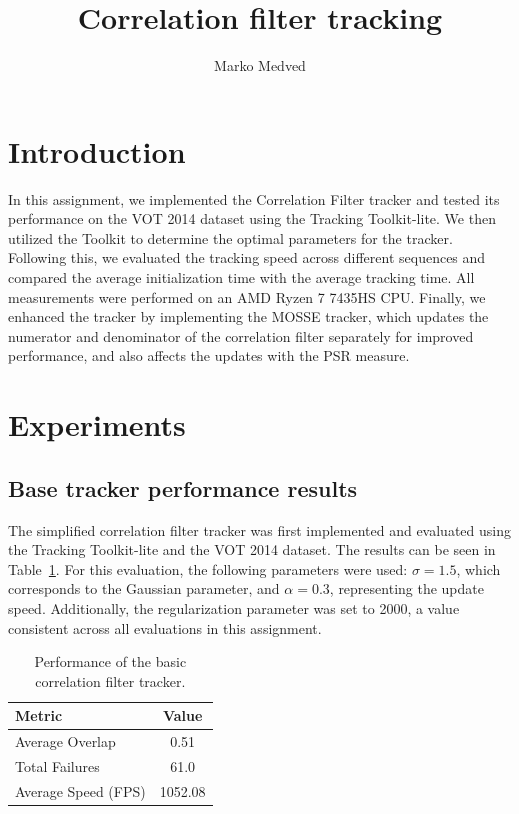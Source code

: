 \documentclass[9pt]{IEEEtran}
\title{\vspace{0ex}
Correlation ﬁlter tracking}
\author{Marko Medved\vspace{-4.0ex}}
\begin{document}
\maketitle

\section{Introduction}
In this assignment, we implemented the Correlation Filter tracker and tested its performance on the VOT 
2014 dataset using the Tracking Toolkit-lite. We then utilized the Toolkit to determine the optimal parameters
 for the tracker. Following this, we evaluated the tracking speed across different sequences and compared the
  average initialization time with the average tracking time. All measurements were performed on an AMD Ryzen 
  7 7435HS CPU. Finally, we enhanced the tracker by implementing the MOSSE tracker, which updates the numerator
   and denominator of the correlation filter separately for improved performance, and also affects the updates
   with the PSR measure.

\section{Experiments}
\subsection{Base tracker performance results}
The simplified correlation filter tracker was first implemented and evaluated using the Tracking Toolkit-lite 
and the VOT 2014 dataset. The results can be seen in Table~\ref{tab:corr_tracker_results}. For this evaluation, 
the following parameters were used: $\sigma=1.5$, which corresponds to the Gaussian parameter, and $\alpha = 0.3$, 
representing the update speed. Additionally, the regularization parameter was set to 2000, a value consistent across 
all evaluations in this assignment.


\begin{table}[ht]
  \centering
  \caption{Performance of the basic correlation filter tracker.}
  \begin{tabular}{l|c}
  \hline
  \textbf{Metric}            & \textbf{Value}        \\
  \hline
  Average Overlap            & 0.51                  \\
  Total Failures             & 61.0                    \\
  Average Speed (FPS)        & 1052.08            \\
  \hline
  \end{tabular}
  \label{tab:corr_tracker_results}
  \end{table}
\end{document}
